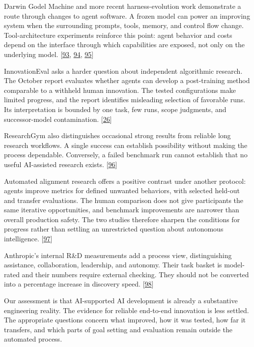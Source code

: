 Darwin Godel Machine and more recent harness-evolution work demonstrate a route through changes to agent software. A frozen model can power an improving system when the surrounding prompts, tools, memory, and control flow change. Tool-architecture experiments reinforce this point: agent behavior and costs depend on the interface through which capabilities are exposed, not only on the underlying model. [\hyperlink{ref-dgm2025}{93}, \hyperlink{ref-darwinx2026}{94}, \hyperlink{ref-interfaces2026}{95}]


InnovationEval asks a harder question about independent algorithmic research. The October report evaluates whether agents can develop a post-training method comparable to a withheld human innovation. The tested configurations make limited progress, and the report identifies misleading selection of favorable runs. Its interpretation is bounded by one task, few runs, scope judgments, and successor-model contamination. [\hyperlink{ref-innovationeval2026}{26}]


ResearchGym also distinguishes occasional strong results from reliable long research workflows. A single success can establish possibility without making the process dependable. Conversely, a failed benchmark run cannot establish that no useful AI-assisted research exists. [\hyperlink{ref-researchgym2026}{96}]


Automated alignment research offers a positive contrast under another protocol: agents improve metrics for defined unwanted behaviors, with selected held-out and transfer evaluations. The human comparison does not give participants the same iterative opportunities, and benchmark improvements are narrower than overall production safety. The two studies therefore sharpen the conditions for progress rather than settling an unrestricted question about autonomous intelligence. [\hyperlink{ref-alignment2026}{97}]


Anthropic's internal R\&D measurements add a process view, distinguishing assistance, collaboration, leadership, and autonomy. Their task basket is model-rated and their numbers require external checking. They should not be converted into a percentage increase in discovery speed. [\hyperlink{ref-rdmetrics2026}{98}]


Our assessment is that AI-supported AI development is already a substantive engineering reality. The evidence for reliable end-to-end innovation is less settled. The appropriate questions concern what improved, how it was tested, how far it transfers, and which parts of goal setting and evaluation remain outside the automated process.



